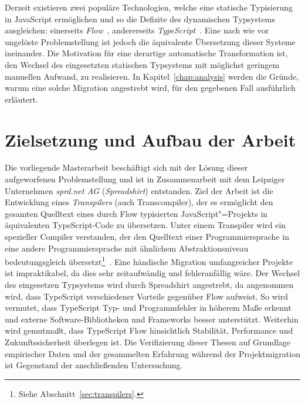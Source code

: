 Derzeit existieren zwei populäre Technologien, welche eine statische Typisierung in JavaScript ermöglichen und so die Defizite des dynamischen Typsystems ausgleichen: einerseits \textit{Flow}~\autocite{FLOW:PAPER}, andererseits \textit{TypeScript}~\autocite{TYPESCRIPT:SPEC}. Eine nach wie vor ungelöste Problemstellung ist jedoch die äquivalente Übersetzung dieser Systeme ineinander. Die Motivation für eine derartige automatische Transformation ist, den Wechsel des eingesetzten statischen Typsystems mit möglichst geringem manuellen Aufwand, zu realisieren. In Kapitel~\ref{chap:analysis} werden die Gründe, warum eine solche Migration angestrebt wird, für den gegebenen Fall ausführlich erläutert.

\section{Zielsetzung und Aufbau der Arbeit}

Die vorliegende Masterarbeit beschäftigt sich mit der Lösung dieser aufgeworfenen Problemstellung und ist in Zusammenarbeit mit dem Leipziger Unternehmen \textit{sprd.net AG} (\textit{Spreadshirt}) entstanden. Ziel der Arbeit ist die Entwicklung eines \emph{Transpilers} (auch Transcompiler), der es ermöglicht den gesamten Quelltext eines durch Flow typisierten JavaScript"=Projekts in äquivalenten TypeScript-Code zu übersetzen. Unter einem Transpiler wird ein spezieller Compiler verstanden, der den Quelltext einer Programmiersprache in eine andere Programmiersprache mit ähnlichem Abstraktionsniveau bedeutungsgleich übersetzt\footnote{Siehe Abschnitt~\ref{sec:transpilers}.}~\autocite{EVGENIY:2016}.
Eine händische Migration umfangreicher Projekte ist impraktikabel, da dies sehr zeitaufwändig und fehleranfällig wäre. Der Wechsel des eingesetzen Typsystems wird durch Spreadshirt angestrebt, da angenommen wird, dass TypeScript verschiedener Vorteile gegenüber Flow aufweist. So wird vermutet, dass TypeScript Typ- und Programmfehler in höherem Maße erkennt und externe Software-Bibliotheken und Frameworks besser unterstützt. Weiterhin wird gemutmaßt, dass TypeScript Flow hinsichtlich Stabilität, Performance und Zukunftssicherheit überlegen ist. Die Verifizierung dieser Thesen auf Grundlage empirischer Daten und der gesammelten Erfahrung während der Projektmigration ist Gegenstand der anschließenden Untersuchung.

